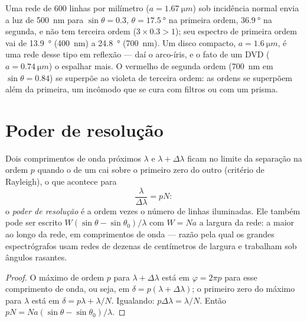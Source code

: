 \begin{example}\label{ex:b2:gratings:examples}
Uma rede de $600$ linhas por milímetro ($a = \qty{1.67}{\micro m}$) sob incidência
normal envia a luz de \qty{500}{nm} para $\sin\theta = 0.3$, $\theta = \qty{17.5}{\degree}$ na
primeira ordem, $\qty{36.9}{\degree}$ na segunda, e não tem terceira ordem
($3 \times 0.3 > 1$); seu espectro de primeira ordem vai de \qty{13.9}{\degree}
(\qty{400}{nm}) a \qty{24.8}{\degree} (\qty{700}{nm}). Um disco compacto, $a =
\qty{1.6}{\micro m}$, é uma rede desse tipo em reflexão --- daí o arco-íris,
e o fato de um DVD ($a = \qty{0.74}{\micro m}$) o espalhar mais. O
vermelho de segunda ordem (\qty{700}{nm} em $\sin\theta = 0.84$) se superpõe ao violeta
de terceira ordem: as ordens se superpõem além da primeira, um incômodo que se cura com filtros
ou com um prisma.
\end{example}

\section{Poder de resolução}

\begin{proposition}\label{prop:b2:gratings:resolution}
Dois comprimentos de onda próximos $\lambda$ e $\lambda + \Delta\lambda$ ficam no limite da separação na ordem $p$
quando o  de um cai sobre o primeiro zero do outro
(critério de Rayleigh), o que acontece para
\[
\frac\lambda{\Delta\lambda} = pN :
\]
o \emph{poder de resolução} é a ordem vezes o número de linhas
iluminadas. Ele também pode ser escrito $W(\sin\theta - \sin\theta_0)/\lambda$ com $W = Na$ a
largura da rede: a maior  ao longo da rede,
em comprimentos de onda --- razão pela qual os grandes espectrógrafos usam redes de dezenas
de centímetros de largura e trabalham sob ângulos rasantes.
\end{proposition}

\begin{proof}
O máximo de ordem $p$ para $\lambda + \Delta\lambda$ está em $\varphi = 2\pi p$ para esse
comprimento de onda, ou seja, em $\delta = p(\lambda + \Delta\lambda)$; o primeiro zero do máximo
para $\lambda$ está em $\delta = p\lambda + \lambda/N$. Igualando: $p\Delta\lambda = \lambda/N$. Então $pN =
Na(\sin\theta - \sin\theta_0)/\lambda$.
\end{proof}

